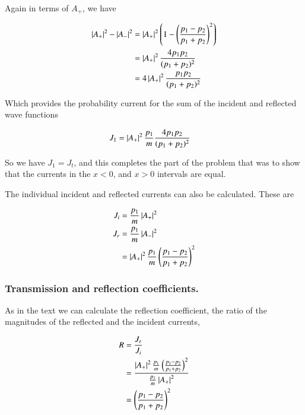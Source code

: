 \documentclass{article}
\begin{document}
Again in terms of $A_{+}$, we have

\begin{align*}
\left\lvert{A_{+} }\right\rvert^2 -\left\lvert{A_{-} }\right\rvert^2
&=
\left\lvert{A_{+}}\right\rvert^2 \left( 1 - \left( \frac{ p_1 - p_2 }{p_1 + p_2} \right)^2 \right) \\
&=
\left\lvert{A_{+}}\right\rvert^2
\frac{ 4 p_1 p_2 }{(p_1 + p_2)^2} \\
&=
4 \left\lvert{A_{+}}\right\rvert^2 \frac{ p_1 p_2 }{(p_1 + p_2)^2} \\
\end{align*}

Which provides the probability current for the sum of the incident and reflected wave functions

\begin{align}\label{eqn:current1}
J_1
&=
\left\lvert{A_{+}}\right\rvert^2
\frac{p_1}{m}
\frac{ 4 p_1 p_2 }{(p_1 + p_2)^2}
\end{align}

So we have $J_1 = J_t$, and this completes the 
part of the problem that was to show that the currents in the $x<0$, and $x>0$
intervals are equal.

The individual incident and reflected currents can also be calculated.  These are

\begin{align*}
J_i &= \frac{ p_1}{m} \left\lvert{ A_{+} }\right\rvert^2 \\
J_r &= \frac{ p_1}{m} \left\lvert{ A_{-} }\right\rvert^2  \\
&=
\left\lvert{ A_{+} }\right\rvert^2
\frac{ p_1 }{m }
\left( \frac{ p_1 - p_2 }{p_1 + p_2} \right)^2
\end{align*}


\subsubsection{Transmission and reflection coefficients. }

As in the text we can calculate the reflection coefficient, the ratio of the magnitudes of the reflected and the incident currents,

\begin{align*}
R
&= \frac{J_r}{J_i}  \\
&=
\frac{\left\lvert{ A_{+} }\right\rvert^2
\frac{ p_1 }{m }
\left( \frac{ p_1 - p_2 }{p_1 + p_2} \right)^2 }{
\frac{ p_1}{m}
\left\lvert{ A_{+} }\right\rvert^2 } \\
&=
\left( \frac{ p_1 - p_2 }{p_1 + p_2} \right)^2
\\
\end{align*}
\end{document}
